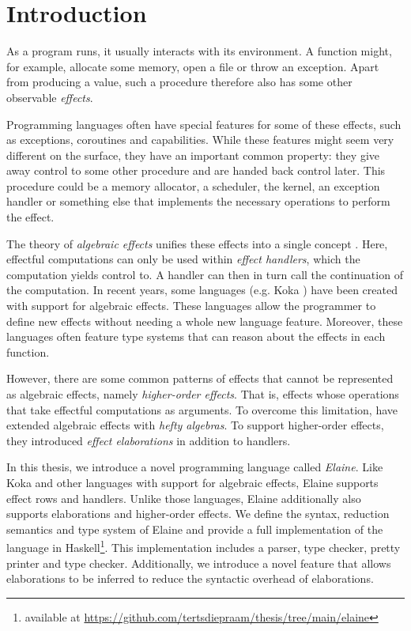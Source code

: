 \chapter{Introduction}\label{chap:introduction}

As a program runs, it usually interacts with its environment. A function might, for example, allocate some memory, open a file or throw an exception. Apart from producing a value, such a procedure therefore also has some other observable \emph{effects}.

Programming languages often have special features for some of these effects, such as exceptions, coroutines and capabilities. While these features might seem very different on the surface, they have an important common property: they give away control to some other procedure and are handed back control later. This procedure could be a memory allocator, a scheduler, the kernel, an exception handler or something else that implements the necessary operations to perform the effect.

The theory of \emph{algebraic effects} unifies these effects into a single concept \autocite{goos_adequacy_2001, castagna_handlers_2009}. Here, effectful computations can only be used within \emph{effect handlers}, which the computation yields control to. A handler can then in turn call the continuation of the computation. In recent years, some languages (e.g. Koka \autocite{leijen_koka_2014}) have been created with support for algebraic effects. These languages allow the programmer to define new effects without needing a whole new language feature. Moreover, these languages often feature type systems that can reason about the effects in each function.

However, there are some common patterns of effects that cannot be represented as algebraic effects, namely \emph{higher-order effects}. That is, effects whose operations that take effectful computations as arguments. To overcome this limitation, \textcite{bach_poulsen_hefty_2023} have extended algebraic effects with \emph{hefty algebras}. To support higher-order effects, they introduced \emph{effect elaborations} in addition to handlers.

In this thesis, we introduce a novel programming language called \emph{Elaine}. Like Koka and other languages with support for algebraic effects, Elaine supports effect rows and handlers. Unlike those languages, Elaine additionally also supports elaborations and higher-order effects. We define the syntax, reduction semantics and type system of Elaine and provide a full implementation of the language in Haskell\footnote{available at \url{https://github.com/tertsdiepraam/thesis/tree/main/elaine}}. This implementation includes a parser, type checker, pretty printer and type checker. Additionally, we introduce a novel feature that allows elaborations to be inferred to reduce the syntactic overhead of elaborations.

